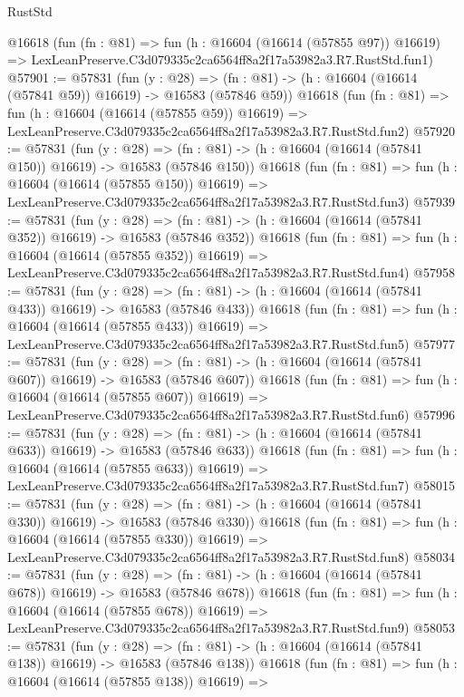 \begin{lexlean}{RustStd}
\begin{coremodule}
    @16618
    (fun (fn : @81) =>
    fun (h : @16604 (@16614 (@57855 @97)) @16619) =>
    LexLeanPreserve.C3d079335c2ca6564ff8a2f17a53982a3.R7.RustStd.fun1)
@57901 := @57831
    (fun (y : @28) =>
    (fn : @81) -> (h : @16604 (@16614 (@57841 @59)) @16619) -> @16583 (@57846 @59))
    @16618
    (fun (fn : @81) =>
    fun (h : @16604 (@16614 (@57855 @59)) @16619) =>
    LexLeanPreserve.C3d079335c2ca6564ff8a2f17a53982a3.R7.RustStd.fun2)
@57920 := @57831
    (fun (y : @28) =>
    (fn : @81) -> (h : @16604 (@16614 (@57841 @150)) @16619) -> @16583 (@57846 @150))
    @16618
    (fun (fn : @81) =>
    fun (h : @16604 (@16614 (@57855 @150)) @16619) =>
    LexLeanPreserve.C3d079335c2ca6564ff8a2f17a53982a3.R7.RustStd.fun3)
@57939 := @57831
    (fun (y : @28) =>
    (fn : @81) -> (h : @16604 (@16614 (@57841 @352)) @16619) -> @16583 (@57846 @352))
    @16618
    (fun (fn : @81) =>
    fun (h : @16604 (@16614 (@57855 @352)) @16619) =>
    LexLeanPreserve.C3d079335c2ca6564ff8a2f17a53982a3.R7.RustStd.fun4)
@57958 := @57831
    (fun (y : @28) =>
    (fn : @81) -> (h : @16604 (@16614 (@57841 @433)) @16619) -> @16583 (@57846 @433))
    @16618
    (fun (fn : @81) =>
    fun (h : @16604 (@16614 (@57855 @433)) @16619) =>
    LexLeanPreserve.C3d079335c2ca6564ff8a2f17a53982a3.R7.RustStd.fun5)
@57977 := @57831
    (fun (y : @28) =>
    (fn : @81) -> (h : @16604 (@16614 (@57841 @607)) @16619) -> @16583 (@57846 @607))
    @16618
    (fun (fn : @81) =>
    fun (h : @16604 (@16614 (@57855 @607)) @16619) =>
    LexLeanPreserve.C3d079335c2ca6564ff8a2f17a53982a3.R7.RustStd.fun6)
@57996 := @57831
    (fun (y : @28) =>
    (fn : @81) -> (h : @16604 (@16614 (@57841 @633)) @16619) -> @16583 (@57846 @633))
    @16618
    (fun (fn : @81) =>
    fun (h : @16604 (@16614 (@57855 @633)) @16619) =>
    LexLeanPreserve.C3d079335c2ca6564ff8a2f17a53982a3.R7.RustStd.fun7)
@58015 := @57831
    (fun (y : @28) =>
    (fn : @81) -> (h : @16604 (@16614 (@57841 @330)) @16619) -> @16583 (@57846 @330))
    @16618
    (fun (fn : @81) =>
    fun (h : @16604 (@16614 (@57855 @330)) @16619) =>
    LexLeanPreserve.C3d079335c2ca6564ff8a2f17a53982a3.R7.RustStd.fun8)
@58034 := @57831
    (fun (y : @28) =>
    (fn : @81) -> (h : @16604 (@16614 (@57841 @678)) @16619) -> @16583 (@57846 @678))
    @16618
    (fun (fn : @81) =>
    fun (h : @16604 (@16614 (@57855 @678)) @16619) =>
    LexLeanPreserve.C3d079335c2ca6564ff8a2f17a53982a3.R7.RustStd.fun9)
@58053 := @57831
    (fun (y : @28) =>
    (fn : @81) -> (h : @16604 (@16614 (@57841 @138)) @16619) -> @16583 (@57846 @138))
    @16618
    (fun (fn : @81) =>
    fun (h : @16604 (@16614 (@57855 @138)) @16619) =>

\end{coremodule}
\end{lexlean}
